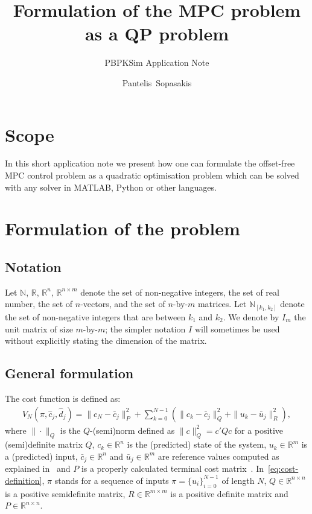 \documentclass[12pt]{scrartcl}
\title{Formulation of the MPC problem as a QP problem}
\subtitle{PBPKSim Application Note}
\author{Pantelis~Sopasakis}
\newcommand{\N}{\mathbb{N}}
\renewcommand{\Re}{\mathbb{R}}
\newcommand{\bcj}{\bar{c}_j}
\newcommand{\buj}{\bar{u}_j}
\begin{document}
\maketitle

\section*{Scope}
In this short application note we present how 
one can formulate the offset-free MPC control problem
as a quadratic optimisation problem which can be solved
with any solver in MATLAB, Python or other languages. 

\section*{Formulation of the problem}

\subsection*{Notation}
Let $\N$, $\Re$, $\Re^n$, $\Re^{n\times m}$ denote the set
of non-negative integers, the set of real number, the set of $n$-vectors,
and the set of $n$-by-$m$ matrices. Let $\N_{[k_1, k_2]}$ denote the
set of non-negative integers that are between $k_1$ and $k_2$.
We denote by $I_m$ the unit matrix of size $m$-by-$m$; the simpler
notation $I$ will sometimes be used without explicitly stating the
dimension of the matrix.

\subsection*{General formulation}
The cost function is defined as:
\begin{align}\label{eq:cost-definition}
V_N(\pi, \hat{c}_j, \hat{d}_j) = \|c_N - \bar{c}_j\|_P^2 + \sum_{k=0}^{N-1}\left( 
\|c_k-\bar{c}_j\|_Q^2+\|u_k-\bar{u}_j\|_R^2
\right),
\end{align}
where $\|\cdot\|_Q$ is the $Q$-(semi)norm defined as $\|c\|_Q^2=c'Qc$ for 
a positive (semi)definite matrix $Q$, $c_k\in\Re^n$ is the (predicted) state of the system,
$u_k\in\Re^m$ is a (predicted) input, $\bcj\in\Re^n$ and $\buj\in\Re^m$ are reference values
computed as explained in~\cite[Eq. (33)]{SopPatSar14} and $P$ is a 
properly calculated terminal cost matrix~\cite[Eq. (32)]{SopPatSar14}.
In~\eqref{eq:cost-definition}, $\pi$ stands for a sequence of inputs
$\pi=\{u_i\}_{i=0}^{N-1}$ of length $N$, $Q\in\Re^{n\times n}$
is a positive semidefinite matrix, $R\in\Re^{m\times m}$ is a 
positive definite matrix and $P\in\Re^{n\times n}$.
\end{document}
